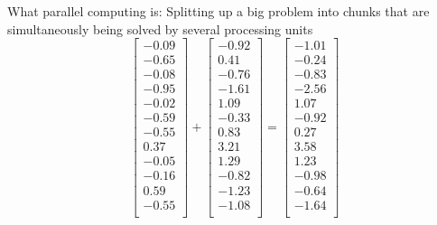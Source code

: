 \documentclass[xcolor=dvipsnames,aspectratio=169]{beamer}
\begin{document}
\begin{frame}{What parallel computing is:}
Splitting up a big problem into chunks that are simultaneously being solved by several processing units
\begin{equation*}
\begin{bmatrix}
  -0.09 \\ 
  -0.65 \\ 
  -0.08 \\ 
  \hline
  -0.95 \\ 
  -0.02 \\ 
  -0.59 \\ 
    \hline
  -0.55 \\ 
  0.37 \\ 
  -0.05 \\ 
    \hline
  -0.16 \\ 
  0.59 \\ 
  -0.55 \\ 
  \end{bmatrix}
+
\begin{bmatrix}
  -0.92 \\ 
  0.41 \\ 
  -0.76 \\ 
    \hline
  -1.61 \\ 
  1.09 \\ 
  -0.33 \\ 
    \hline
  0.83 \\ 
  3.21 \\ 
  1.29 \\ 
    \hline
  -0.82 \\ 
  -1.23 \\ 
  -1.08 \\ 
  \end{bmatrix}
=
\begin{bmatrix}
  -1.01 \\ 
  -0.24 \\ 
  -0.83 \\ 
    \hline
  -2.56 \\ 
  1.07 \\ 
  -0.92 \\ 
    \hline
  0.27 \\ 
  3.58 \\ 
  1.23 \\ 
    \hline
  -0.98 \\ 
  -0.64 \\ 
  -1.64 \\ 
  \end{bmatrix} 
\end{equation*}
\end{frame}
\end{document}
